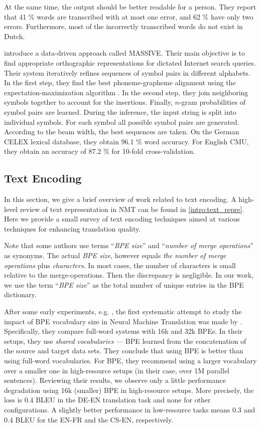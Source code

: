 At the same time, the output should be better readable for a person. They report that 41 \% words are transcribed with at most one error, and 62 \% have only two errors. Furthermore, most of the incorrectly transcribed words do not exist in Dutch.

 introduce a data-driven approach called MASSIVE. Their main objective is to find appropriate orthographic representations for dictated Internet search queries. Their system iteratively refines sequences of symbol pairs in different alphabets. In the first step, they find the best phoneme-grapheme alignment using the expectation-maximization algorithm . In the second step, they join neighboring symbols together to account for the insertions. Finally, $n$-gram probabilities of symbol pairs are learned. During the inference, the input string is split into individual symbols. For each symbol all possible symbol pairs are generated. According to the beam width, the best sequences are taken. On the German CELEX lexical database, they obtain 96.1 \% word accuracy. For English CMU, they obtain an accuracy of 87.2 \% for 10-fold cross-validation.

\subsection{Text Encoding}
\label{easr:re_encoding}
In this section, we give a brief overview of work related to text encoding. A high-level review of text representation in NMT can be found in \cref{intro:text_repre}. Here we provide a small survey of text encoding techniques aimed at various techniques for enhancing translation quality. 

Note that some authors use terms ``\textit{BPE size}'' and ``\textit{number of merge operations}'' as synonyms. The actual \textit{BPE size}, however equals \textit{the number of merge operations} plus \textit{characters}. In most cases, the number of characters is small relative to the merge-operations. Then the discrepancy is negligible. In our work, we use the term ``\textit{BPE size}'' as the total number of unique entries in the BPE dictionary.

After some early experiments, e.g. \citet{bojar}, the first systematic attempt to study the impact of BPE vocabulary size in Neural Machine Translation was made by . Specifically, they compare full-word systems with 16k and 32k BPEs. In their setups, they use \textit{shared vocabularies} --- BPE learned from the concatenation of the source and target data sets. They conclude that using BPE is better than using full-word vocabularies. For BPE, they recommend using a larger vocabulary over a smaller one in high-resource setups (in their case, over 1M parallel sentences). Reviewing their results, we observe only a little performance degradation using 16k (smaller) BPE in high-resource setups. More precisely, the loss is 0.4 BLEU in the DE-EN translation task and none for other configurations. A slightly better performance in low-resource tasks means 0.3 and 0.4 BLEU for the EN-FR and the CS-EN, respectively.

